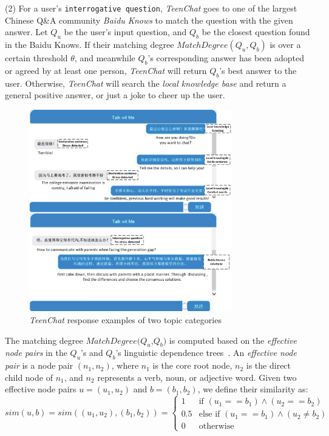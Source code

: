 \noindent (2) For a user's \texttt{interrogative question}, \emph{TeenChat} goes to one of the largest Chinese Q\&A community \emph{Baidu Knows} to match the question with the given answer. Let $Q_u$ be the user's input question, and $Q_b$ be the closest question found in the Baidu Knows. If their matching degree $MatchDegree(Q_u,Q_b)$ is over a certain threshold $\theta$, and meanwhile $Q_b$'s corresponding answer has been adopted or agreed by at least one person, \emph{TeenChat} will return $Q_b$'s best answer to the user. Otherwise, \emph{TeenChat} will search the \emph{local knowledge base} and return a general positive answer, or just a joke to cheer up the user.
\begin{figure}
\begin{minipage}{\textwidth}
\centering
\includegraphics[height=8.8cm]{figs/Dialogexample.eps}
\caption{\emph{TeenChat} response examples of two topic categories}
\end{minipage}
\label{fig:example}
\end{figure}
The matching degree $MatchDegree$$(Q_u$,$Q_b)$ is computed based on the \emph{effective
node pairs} in the $Q_u$'s and $Q_b$'s linguistic dependence trees~\cite{36li2003}.
An \emph{effective node pair} is a node pair $(n_1,n_2)$, where $n_1$ is the core root node, $n_2$ is the direct child node of $n_1$, and $n_2$ represents a verb, noun, or adjective word. Given two effective node pairs $u=(u_1,u_2)$ and $b=(b_1,b_2)$, we define their similarity as:
\[sim(u,b)=sim((u_1,u_2),(b_1,b_2)) = \left\{ \begin{array}{ll}
1   & \mbox{if $(u_1==b_1) \wedge (u_2==b_2)$} \\
0.5 & \mbox{else if $(u_1==b_1) \wedge (u_2 \neq b_2)$} \\
0   & \mbox{otherwise}
\end{array}
\right. \]

